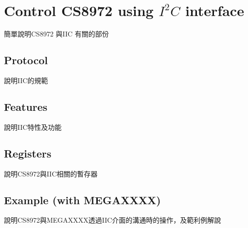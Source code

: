 \chapter{Control CS8972 using {$I^2C$} interface}
簡單說明CS8972 與IIC 有關的部份
	\section{Protocol}
	說明IIC的規範

	\section{Features}
	說明IIC特性及功能

	\section{Registers}
	說明CS8972與IIC相關的暫存器
	
	\section{Example (with MEGAXXXX)}
	說明CS8972與MEGAXXXX透過IIC介面的溝通時的操作，及範利例解說
